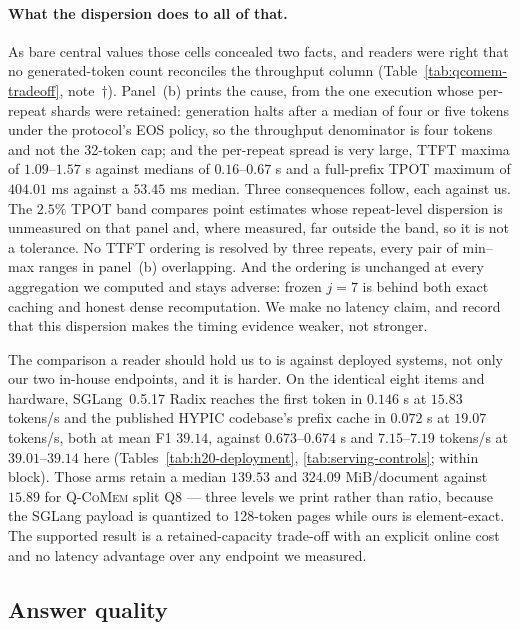 \documentclass{article}
\newcommand{\qcomem}{\textsc{Q-CoMem}}
\begin{document}
\paragraph{What the dispersion does to all of that.}
As bare central values those cells concealed two facts, and readers were right
that no generated-token count reconciles the throughput column
(Table~\ref{tab:qcomem-tradeoff}, note~$\dagger$).  Panel~(b) prints the cause,
from the one execution whose per-repeat shards were retained: generation halts
after a median of four or five tokens under the protocol's EOS policy, so the
throughput denominator is four tokens and not the 32-token cap; and the
per-repeat spread is very large, TTFT maxima of $1.09$--$1.57$ s against medians
of $0.16$--$0.67$ s and a full-prefix TPOT maximum of $404.01$ ms against a
$53.45$ ms median.  Three consequences follow, each against us.  The $2.5\%$ TPOT
band compares point estimates whose repeat-level dispersion is unmeasured on that
panel and, where measured, far outside the band, so it is not a tolerance.  No
TTFT ordering is resolved by three repeats, every pair of min--max ranges in
panel~(b) overlapping.  And the ordering is unchanged at every aggregation we
computed and stays adverse: frozen $j=7$ is behind both exact caching and honest
dense recomputation.  We make no latency claim, and record that this dispersion
makes the timing evidence weaker, not stronger.

The comparison a reader should hold us to is against deployed systems, not only
our two in-house endpoints, and it is harder.  On the identical eight items and
hardware, SGLang~0.5.17 Radix reaches the first token in $0.146$ s at $15.83$
tokens/s and the published HYPIC codebase's prefix cache in $0.072$ s at $19.07$
tokens/s, both at mean F1 $39.14$, against $0.673$--$0.674$ s and $7.15$--$7.19$
tokens/s at $39.01$--$39.14$ here (Tables~\ref{tab:h20-deployment},
\ref{tab:serving-controls}; within block).  Those arms retain a median $139.53$
and $324.09$ MiB/document against $15.89$ for \qcomem{} split Q8 --- three levels
we print rather than ratio, because the SGLang payload is quantized to 128-token
pages while ours is element-exact.  The supported result is a retained-capacity
trade-off with an explicit online cost and no latency advantage over any endpoint
we measured.


\subsection{Answer quality}
\label{sec:quality}
\end{document}
